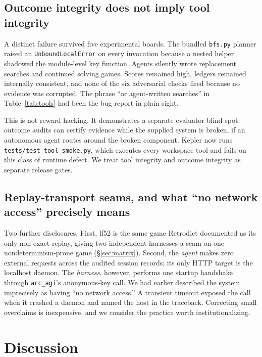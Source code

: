 \documentclass[11pt]{article}
\begin{document}
\subsection{Outcome integrity does not imply tool integrity}\label{sec:toolintegrity}

A distinct failure survived five experimental boards. The bundled \texttt{bfs.py} planner raised an \texttt{UnboundLocalError} on every invocation because a nested helper shadowed the module-level key function. Agents silently wrote replacement searches and continued solving games. Scores remained high, ledgers remained internally consistent, and none of the six adversarial checks fired because no evidence was corrupted. The phrase ``or agent-written searches'' in Table~\ref{tab:tools} had been the bug report in plain sight.

This is not reward hacking. It demonstrates a separate evaluator blind spot: outcome audits can certify evidence while the supplied system is broken, if an autonomous agent routes around the broken component. Kepler now runs \texttt{tests/test\_tool\_smoke.py}, which executes every workspace tool and fails on this class of runtime defect. We treat tool integrity and outcome integrity as separate release gates.

\subsection{Replay-transport seams, and what ``no network access'' precisely means}\label{sec:seams}

Two further disclosures. First, lf52 is the same game Retrodict documented as its only non-exact replay, giving two independent harnesses a seam on one nondeterminism-prone game (\S\ref{sec:matrix}). Second, the \emph{agent} makes zero external requests across the audited session records; its only HTTP target is the localhost daemon. The \emph{harness}, however, performs one startup handshake through \texttt{arc\_agi}'s anonymous-key call. We had earlier described the system imprecisely as having ``no network access.'' A transient timeout exposed the call when it crashed a daemon and named the host in the traceback. Correcting small overclaims is inexpensive, and we consider the practice worth institutionalizing.

\section{Discussion}\label{sec:discussion}
\end{document}
